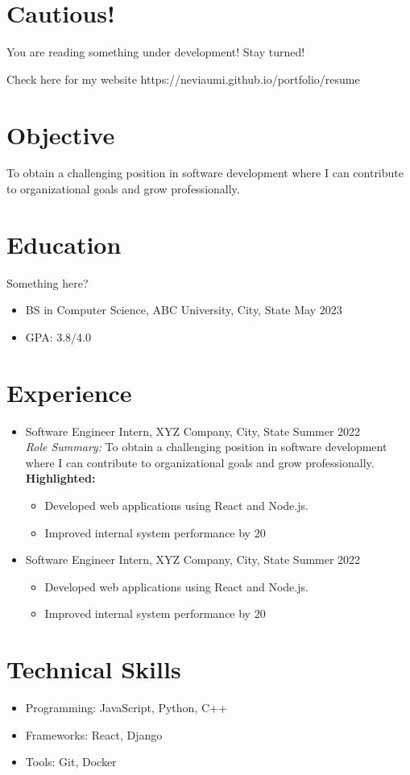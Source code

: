 \documentclass{res}
\begin{document}
    \section{Cautious!}
    You are reading something under development! Stay turned!

    Check here for my website https://neviaumi.github.io/portfolio/resume

    \section{Objective}
    To obtain a challenging position in software development where I can contribute to organizational goals and grow professionally.

    \section{Education}
    Something here?
    \begin{itemize}
        \item BS in Computer Science, ABC University, City, State \hfill May 2023
        \item GPA: 3.8/4.0
    \end{itemize}

    \section{Experience}
    \begin{itemize}
        \item Software Engineer Intern, XYZ Company, City, State \hfill Summer 2022
        \\ \textit{Role Summary:}
        To obtain a challenging position in software development where I can contribute to organizational
        goals and grow professionally.
        \\ \textbf{Highlighted:}
        \begin{itemize}
            \item Developed web applications using React and Node.js.
            \item Improved internal system performance by 20%
        \end{itemize}
        \item Software Engineer Intern, XYZ Company, City, State \hfill Summer 2022
        \begin{itemize}
            \item Developed web applications using React and Node.js.
            \item Improved internal system performance by 20%
        \end{itemize}
    \end{itemize}

    \section{Technical Skills}
    \begin{itemize}
        \item Programming: JavaScript, Python, C++
        \item Frameworks: React, Django
        \item Tools: Git, Docker
    \end{itemize}
\end{document}
